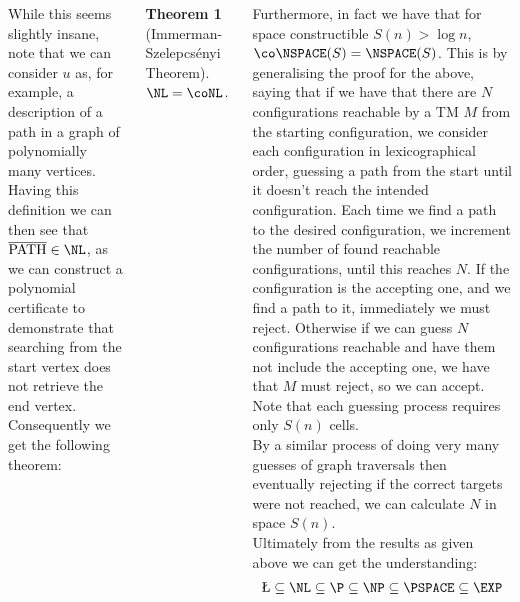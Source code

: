 \documentclass{tikzposter} %
\newtheorem{theorem}{Theorem}
\begin{document}
\begin{columns}
{  While this seems slightly insane, note that we can consider $u$ as, for example, a description of a path in a graph of polynomially many vertices. Having this definition we can then see that $\overline{\mathrm{PATH}} \in \NL$, as we can construct a polynomial certificate to demonstrate that searching from the start vertex does not retrieve the end vertex. Consequently we get the following theorem: \\

  \begin{theorem}[Immerman-Szelepcs\'enyi Theorem]
  \ $\NL = \coNL$.
  \end{theorem}
  \hphantom{}

  Furthermore, in fact we have that for space constructible $S(n) > \log n$, $\co\NSPACE(S) = \NSPACE(S)$. This is by generalising the proof for the above, saying that if we have that there are $N$ configurations reachable by a TM $M$ from the starting configuration, we consider each configuration in lexicographical order, guessing a path from the start until it doesn't reach the intended configuration. Each time we find a path to the desired configuration, we increment the number of found reachable configurations, until this reaches $N$. If the configuration is the accepting one, and we find a path to it, immediately we must reject. Otherwise if we can guess $N$ configurations reachable and have them not include the accepting one, we have that $M$ must reject, so we can accept. Note that each guessing process requires only $S(n)$ cells. \\

  By a similar process of doing very many guesses of graph traversals then eventually rejecting if the correct targets were not reached, we can calculate $N$ in space $S(n)$. \\

  Ultimately from the results as given above we can get the understanding:
  \begin{align*}
    \L \subseteq \NL \subseteq \P \subseteq \NP \subseteq \PSPACE \subseteq \EXP
  \end{align*}
  }


\end{columns}
\end{document}
